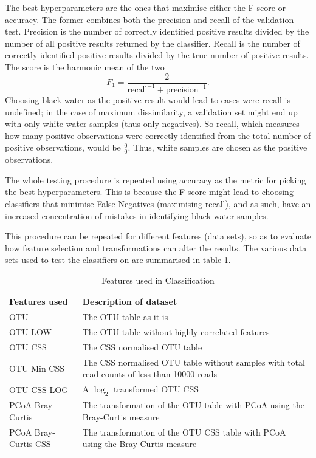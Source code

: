  
The best hyperparameters are the ones that maximise either the F score or accuracy. The former combines both the precision and recall of the validation test. Precision is the number of correctly identified positive results divided by the number of all positive results returned by the classifier. Recall is the number of correctly identified positive results divided by the true number of positive results. The score is the harmonic mean of the two
\begin{equation}
	F_1 = \frac{2}{\text{recall}^{-1} + \text{precision}^{-1}}.
\end{equation} 
Choosing black water as the positive result would lead to cases were recall is undefined; in the case of maximum dissimilarity, a validation set might end up with only white water samples (thus only negatives). So recall, which measures how many positive observations were correctly identified from the total number of positive observations, would be $\frac{0}{0}$. Thus, white samples are chosen as the positive observations.

The whole testing procedure is repeated using accuracy as the metric for picking the best hyperparameters. This is because the F score might lead to choosing classifiers that minimise False Negatives (maximising recall), and as such, have an increased concentration of mistakes in identifying black water samples.

This procedure can be repeated for different features (data sets), so as to evaluate how feature selection and transformations can alter the results.
 The various data sets used to test the classifiers on are summarised in table \ref{table:features}.
\begin{table}
	\caption{Features used in Classification}
	\centering
	\label{table:features}
	\begin{tabularx}{\textwidth}{l X  }
		\hline 
		Features used &Description of dataset\\ 
		
		\hline
		OTU &The OTU table as it is \\
		OTU LOW & The OTU table without highly correlated features\\
		OTU CSS & The CSS normalised OTU table\\
		OTU Min CSS & The CSS normalised OTU table without samples with total read counts of less than 10000 reads  \\
		OTU CSS LOG & A $\log_2$ transformed OTU CSS \\
		PCoA Bray-Curtis &The transformation of the OTU table with PCoA using the Bray-Curtis measure  \\
		PCoA Bray-Curtis CSS &The transformation of the OTU CSS table with PCoA using the Bray-Curtis measure\\
		
		\hline 
	\end{tabularx}
\end{table}


